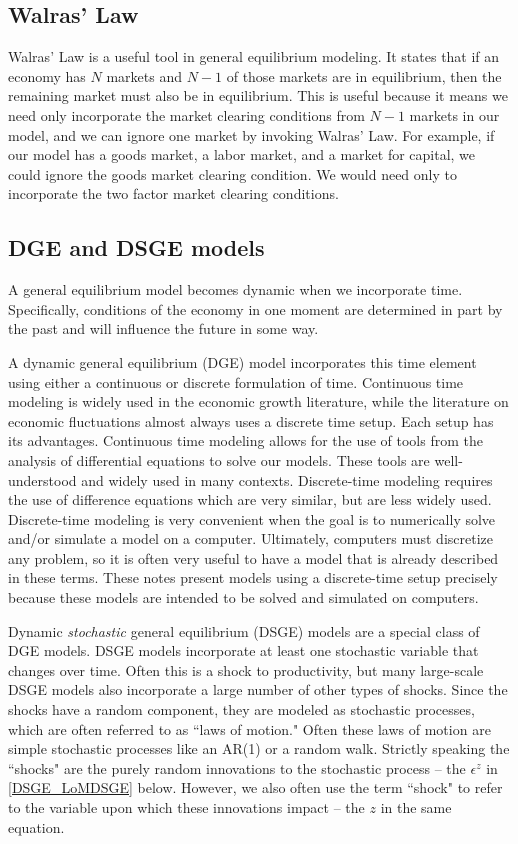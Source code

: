 \documentclass[letterpaper,12pt]{article}
\theoremstyle{definition}
\begin{document}
\begin{spacing}{1.5}
	\subsection{Walras' Law}
		Walras' Law is a useful tool in general equilibrium modeling. It states that if an economy has $N$ markets and $N-1$ of those markets are in equilibrium, then the remaining market must also be in equilibrium. This is useful because it means we need only incorporate the market clearing conditions from $N-1$ markets in our model, and we can ignore one market by invoking Walras' Law. For example, if our model has a goods market, a labor market, and a market for capital, we could ignore the goods market clearing condition. We would need only to incorporate the two factor market clearing conditions.

	\subsection{DGE and DSGE models}
		A general equilibrium model becomes dynamic when we incorporate time. Specifically, conditions of the economy in one moment are determined in part by the past and will influence the future in some way.

		A dynamic general equilibrium (DGE) model incorporates this time element using either a continuous or discrete formulation of time. Continuous time modeling is widely used in the economic growth literature, while the literature on economic fluctuations almost always uses a discrete time setup. Each setup has its advantages. Continuous time modeling allows for the use of tools from the analysis of differential equations to solve our models. These tools are well-understood and widely used in many contexts. Discrete-time modeling requires the use of difference equations which are very similar, but are less widely used. Discrete-time modeling is very convenient when the goal is to numerically solve and/or simulate a model on a computer. Ultimately, computers must discretize any problem, so it is often very useful to have a model that is already described in these terms. These notes present models using a discrete-time setup precisely because these models are intended to be solved and simulated on computers.

		Dynamic \emph{stochastic} general equilibrium (DSGE) models are a special class of DGE models. DSGE models incorporate at least one stochastic variable that changes over time. Often this is a shock to productivity, but many large-scale DSGE models also incorporate a large number of other types of shocks. Since the shocks have a random component, they are modeled as stochastic processes, which are often referred to as ``laws of motion." Often these laws of motion are simple stochastic processes like an AR(1) or a random walk. Strictly speaking the ``shocks" are the purely random innovations to the stochastic process -- the $\epsilon^z$ in \eqref{DSGE_LoMDSGE} below. However, we also often use the term ``shock" to refer to the variable upon which these innovations impact -- the $z$ in the same equation.


\end{spacing}
\end{document}
